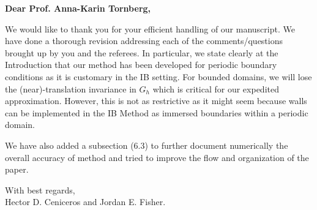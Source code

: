 \documentclass[12pt]{article}
\title{}
\author{}
\begin{document}
\maketitle
{\bf Dear Prof. Anna-Karin Tornberg,}

We would like to thank you for your efficient handling of our manuscript. We have done a thorough revision addressing each of the comments/questions brought up by you and the referees. 
In particular, we state clearly at the Introduction that our method has been developed for periodic boundary conditions as it is customary in the IB setting. For bounded domains,  we will lose the 
(near)-translation invariance in $G_h$ which is critical for our expedited approximation. However, this is not as restrictive as it might seem because walls can be implemented in the IB Method 
as immersed boundaries within a periodic domain.

 We have also added a subsection (6.3) to further document numerically the overall accuracy of method and tried  to improve the flow and organization of the paper. 

With best regards, \\

Hector D. Ceniceros and Jordan E. Fisher.

 
\end{document}

